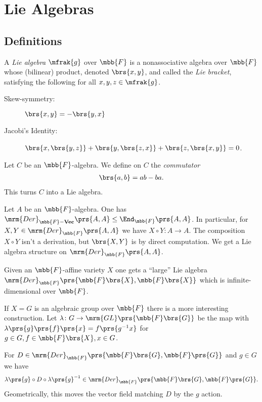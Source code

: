 \documentclass[10pt,a4paper,twoside,openany,hidelinks]{book}
\begin{document}

\section{Lie Algebras}

\subsection{Definitions}



\begin{definition}
A \emph{Lie algebra} $\mfrak{g}$ over $\mbb{F}$ is a nonassociative algebra over $\mbb{F}$ whose (bilinear) product, denoted $\brs{x,y}$, and called the \emph{Lie bracket}, satisfying the following for all $x,y,z \in \mfrak{g}$.
\begin{description}
\item[Skew-symmetry:] $\brs{x,y} = -\brs{y,x}$
\item[Jacobi's Identity:] $\brs{x,\brs{y,z}} + \brs{y,\brs{z,x}} + \brs{z,\brs{x,y}} = 0$.
\end{description}
\end{definition}

\begin{definition}
Let $C$ be an $\mbb{F}$-algebra. We define on $C$ the \emph{commutator}
\begin{align*}
\brs{a,b} = ab - ba \text{.}
\end{align*}
This turns $C$ into a Lie algebra.
\end{definition}

\begin{example}
Let $A$ be an $\mbb{F}$-algebra. One has $\mrm{Der}_{\mbb{F}\mathbf{-Vec}}\prs{A,A} \leq \End_{\mbb{F}}\prs{A,A}$.
In particular, for $X,Y \in \mrm{Der}_{\mbb{F}}\prs{A,A}$ we have $X \circ Y \colon A \to A$. The composition $X \circ Y$ isn't a derivation, but $\brs{X,Y}$ is by direct computation.
We get a Lie algebra structure on $\mrm{Der}_{\mbb{F}}\prs{A,A}$.
\end{example}

\begin{example}
Given an $\mbb{F}$-affine variety $X$ one gets a ``large'' Lie algebra
$\mrm{Der}_{\mbb{F}}\prs{\mbb{F}\brs{X}, \mbb{F}\brs{X}}$ which is infinite-dimensional over $\mbb{F}$.

If $X = G$ is an algebraic group over $\mbb{F}$ there is a more interesting construction. Let $\lambda \colon G \to \mrm{GL}\prs{\mbb{F}\brs{G}}$ be the map with $\lambda\prs{g}\prs{f}\prs{x} = f\prs{g^{-1}x}$ for $g \in G, f \in \mbb{F}\brs{X}, x \in G$.

For $D \in \mrm{Der}_{\mbb{F}}\prs{\mbb{F}\brs{G}, \mbb{F}\prs{G}}$ and $g \in G$ we have
\[\lambda\prs{g} \circ D \circ \lambda\prs{g}^{-1} \in \mrm{Der}_{\mbb{F}}\prs{\mbb{F}\brs{G}, \mbb{F}\prs{G}} \text{.}\]
Geometrically, this moves the vector field matching $D$ by the $g$ action.
\end{example}
\end{document}
